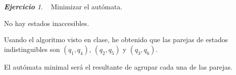 \documentclass[12pt,spanish]{article}
\theoremstyle{definition}
\theoremstyle{remark}
\newtheorem{exercise}{\textbf{Ejercicio}}%
\begin{document}
\begin{exercise}~ Minimizar el autómata. \\
\vspace{-7mm}
  \begin{figure}[H]
    \centering
  \end{figure}
  \vspace{-7mm}
  
  No hay estados inaccesibles.
  
  Usando el algoritmo visto en clase, he obtenido que las parejas de
  estados indistinguibles son $(q_1,q_4)$, $(q_2,q_5)$ y $(q_3,q_6)$.

  El autómata minimal será el resultante de agrupar cada una de las
  parejas.

  \begin{figure}[H]
    \centering
  \end{figure}
  
\end{exercise}
\end{document}
